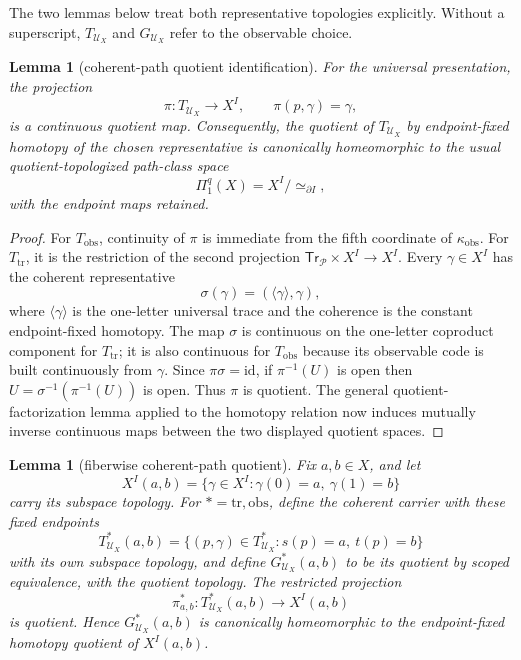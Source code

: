 \documentclass[10pt,reqno]{amsart}
\theoremstyle{definition}
\theoremstyle{plain}
\newtheorem{lemma}[definition]{Lemma}
\theoremstyle{remark}
\begin{document}
The two lemmas below treat both representative topologies explicitly.
Without a superscript, $T_{\mathcal U_X}$ and $G_{\mathcal U_X}$ refer to the
observable choice.

\begin{lemma}[coherent-path quotient identification]
\label{lem:coherent-path-quotient-identification}
For the universal presentation, the projection
\[
  \pi:T_{\mathcal U_X}\longrightarrow X^I,
  \qquad \pi(p,\gamma)=\gamma,
\]
is a continuous quotient map.  Consequently, the quotient of
$T_{\mathcal U_X}$ by endpoint-fixed homotopy of the chosen representative is
canonically homeomorphic to the usual quotient-topologized path-class space
\[
  \Pi_1^q(X)=X^I/{\simeq_{\partial I}},
\]
with the endpoint maps retained.
\end{lemma}

\begin{proof}
For $T_{\mathrm{obs}}$, continuity of $\pi$ is immediate from the fifth
coordinate of $\kappa_{\mathrm{obs}}$.  For $T_{\mathrm{tr}}$, it is the
restriction of the second projection
$\mathsf{Tr}_{\mathcal P}\times X^I\to X^I$.  Every $\gamma\in X^I$ has the
coherent representative
\[
  \sigma(\gamma)=(\langle\gamma\rangle,\gamma),
\]
where $\langle\gamma\rangle$ is the one-letter universal trace and the
coherence is the constant endpoint-fixed homotopy.  The map $\sigma$ is
continuous on the one-letter coproduct component for $T_{\mathrm{tr}}$; it is
also continuous for $T_{\mathrm{obs}}$ because its observable code is built
continuously from $\gamma$.  Since $\pi\sigma=\mathrm{id}$, if
$\pi^{-1}(U)$ is open then
$U=\sigma^{-1}(\pi^{-1}(U))$ is open.  Thus $\pi$ is quotient.  The general quotient-factorization
lemma applied to the homotopy relation now induces mutually inverse
continuous maps between the two displayed quotient spaces.
\end{proof}

\begin{lemma}[fiberwise coherent-path quotient]
\label{lem:fiberwise-coherent-path-quotient}
Fix $a,b\in X$, and let
\[
  X^I(a,b)=\{\gamma\in X^I:\gamma(0)=a,\ \gamma(1)=b\}
\]
carry its subspace topology.  For $*=\mathrm{tr},\mathrm{obs}$, define the
coherent carrier with these fixed endpoints
\[
  T_{\mathcal U_X}^{*}(a,b)=
  \{(p,\gamma)\in T_{\mathcal U_X}^{*}:s(p)=a,\ t(p)=b\}
\]
with its own subspace topology, and define
$G_{\mathcal U_X}^{*}(a,b)$ to be its quotient by scoped equivalence, with
the quotient topology.  The restricted projection
\[
  \pi_{a,b}^{*}:T_{\mathcal U_X}^{*}(a,b)\longrightarrow X^I(a,b)
\]
is quotient.  Hence $G_{\mathcal U_X}^{*}(a,b)$ is canonically homeomorphic
to the endpoint-fixed homotopy quotient of $X^I(a,b)$.
\end{lemma}
\end{document}
